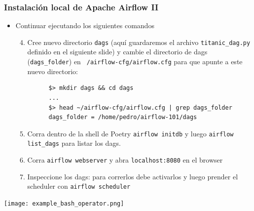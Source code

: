 \documentclass[leqno, 10pt, envcountsect]{beamer}
\numberwithin{equation}{section}
\theoremstyle{definition}
\theoremstyle{example}
\numberwithin{figure}{section}
\numberwithin{table}{section}
\let\olditem\item
\renewcommand{\item}{%
\olditem\vspace{1pt}}
\begin{document}
\begin{frame}[fragile=singleslide]
  \frametitle{Instalación local de Apache Airflow II}
  \begin{itemize}
    \item Continuar ejecutando los siguientes comandos
    \begin{enumerate}
      \setcounter{enumi}{3}
      \item Cree
        nuevo directorio \texttt{dags} (aquí guardaremos el archivo
        \texttt{titanic_dag.py} definido en el siguiente slide) y cambie el directorio de dags
        (\texttt{dags_folder}) en
        \texttt{~/airflow-cfg/airflow.cfg} para que apunte a este nuevo
        directorio:
      \begin{verbatim}
      $> mkdir dags && cd dags
      ...
      $> head ~/airflow-cfg/airflow.cfg | grep dags_folder
      dags_folder = /home/pedro/airflow-101/dags
      \end{verbatim}
    \item Corra dentro de la shell de Poetry \texttt{airflow initdb} y luego \texttt{airflow list_dags}
      para listar los dags.
    \item Corra \texttt{airflow webserver} y abra \texttt{localhost:8080} en
      el browser
    \item Inspeccione los dags: para correrlos debe activarlos y luego
      prender el scheduler con \texttt{airflow scheduler}
    \end{enumerate}
  \end{itemize}
  \begin{center}
    \texttt{[image: example\_bash\_operator.png]}
  \end{center}
\end{frame}
\end{document}
